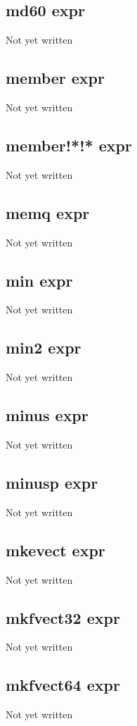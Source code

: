 \documentclass[a4paper,11pt]{article}
\begin{document}
{\subsection{\ttfamily md60 expr}
   Not yet written

\subsection{\ttfamily member expr}
   Not yet written

\subsection{\ttfamily member!*!* expr}
   Not yet written

\subsection{\ttfamily memq expr}
   Not yet written

\subsection{\ttfamily min expr}
   Not yet written

\subsection{\ttfamily min2 expr}
   Not yet written

\subsection{\ttfamily minus expr}
   Not yet written

\subsection{\ttfamily minusp expr}
   Not yet written

\subsection{\ttfamily mkevect expr}
   Not yet written

\subsection{\ttfamily mkfvect32 expr}
   Not yet written

\subsection{\ttfamily mkfvect64 expr}
   Not yet written

}
\end{document}
